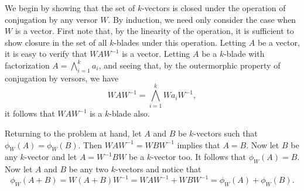 \documentclass[12pt]{article}
\begin{document}
We begin by showing that the set of $k$-vectors is closed under
the operation of conjugation by any versor $W$.  By induction,
we need only consider the case when $W$ is a vector.
First note that, by the linearity of the operation, it is sufficient
to show closure in the set of all $k$-blades under this operation.
Letting $A$ be a vector, it is easy to verify that $WAW^{-1}$ is a vector.
Letting $A$ be a $k$-blade with factorization $A=\bigwedge_{i=1}^k a_i$,
and seeing that, by the outermorphic property of conjugation by versors,
we have
\begin{equation*}
WAW^{-1}=\bigwedge_{i=1}^k Wa_iW^{-1},
\end{equation*}
it follows that $WAW^{-1}$ is a $k$-blade also.

Returning to the problem at hand, let $A$ and $B$ be $k$-vectors such that $\phi_W(A)=\phi_W(B)$.
Then $WAW^{-1}=WBW^{-1}$ implies that $A=B$.  Now let $B$
be any $k$-vector and let $A=W^{-1}BW$ be a $k$-vector too.  It follows that $\phi_W(A)=B$.
Now let $A$ and $B$ be any two $k$-vectors and notice that
\begin{equation*}
\phi_W(A+B) = W(A+B)W^{-1} = WAW^{-1}+WBW^{-1} = \phi_W(A)+\phi_W(B).
\end{equation*}
\end{document}
